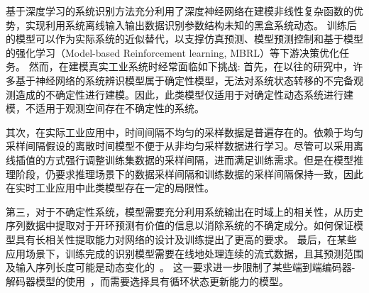 基于深度学习的系统识别方法充分利用了深度神经网络在建模非线性复杂函数的优势，实现利用系统离线输入输出数据识别参数结构未知的黑盒系统动态。
训练后的模型可以作为实际系统的近似替代，以支撑仿真预测、模型预测控制和基于模型的强化学习（Model-based Reinforcement learning, MBRL）等下游决策优化任务。
然而，在建模真实工业系统时经常面临如下挑战:
首先，在以往的研究中，许多基于神经网络的系统辨识模型属于确定性模型，无法对系统状态转移的不完备观测造成的不确定性进行建模。因此，此类模型仅适用于对确定性动态系统进行建模，不适用于观测空间存在不确定性的系统。

其次，在实际工业应用中，时间间隔不均匀的采样数据是普遍存在的\cite{kidger2021}。依赖于均匀采样间隔假设的离散时间模型不便于从非均匀采样数据进行学习。尽管可以采用离线插值的方式强行调整训练集数据的采样间隔，进而满足训练需求。但是在模型推理阶段，仍要求推理场景下的数据采样间隔和训练数据的采样间隔保持一致，因此在实时工业应用中此类模型存在一定的局限性。

第三，对于不确定性系统，模型需要充分利用系统输出在时域上的相关性，从历史序列数据中提取对于开环预测有价值的信息以消除系统的不确定成分。如何保证模型具有长相关性提取能力对网络的设计及训练提出了更高的要求。
最后，在某些应用场景下，训练完成的识别模型需要在线地处理连续的流式数据，且其预测范围及输入序列长度可能是动态变化的~\cite{VSDN_Liu2020}。
这一要求进一步限制了某些端到端编码器-解码器模型的使用~\cite{Rubanova2019,Yildiz2019}，而需要选择具有循环状态更新能力的模型。


